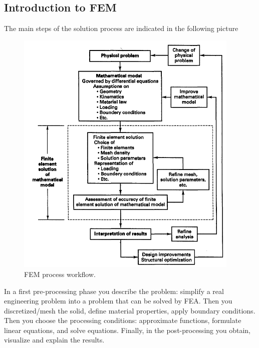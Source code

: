 \subsection{Introduction to FEM}
The main steps of the solution process are indicated in the following picture
\begin{figure}[h]
\centering
  \includegraphics[height=12cm]{img/procedure.png}
   \caption{FEM process workflow.}
 \label{fgr:graft}
\end{figure}
In a first pre-processing phase you describe the problem: simplify a real engineering problem into a problem that can be solved by FEA. Then you discretized/mesh the solid, define material properties, apply boundary conditions.
Then you choose the processing conditions: approximate functions, formulate linear equations, and solve equations.
Finally, in the post-processing you obtain, visualize and explain the results.

